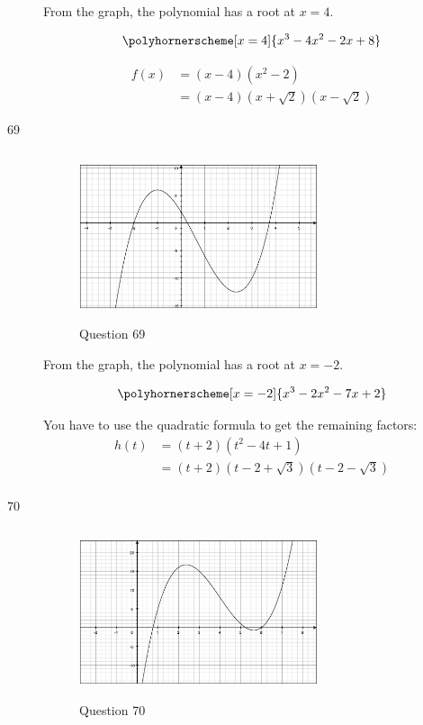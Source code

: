 \documentclass[fleqn,addpoints]{exam}
\begin{document}
\begin{description}
From the graph, the polynomial has a root at $x=4$.

\[
  \polyhornerscheme[x=4]{x^3-4x^2-2x+8} \\
\]

\begin{align*}
  f(x) &= (x-4)(x^2-2) \\
  &= (x-4)(x + \sqrt{2})(x - \sqrt{2})
\end{align*}

\item[69]
\begin{figure}[H]
  \centering
  \includegraphics[width=7cm,height=5cm]{question_69.eps}
  \caption*{Question 69}
\end{figure}

From the graph, the polynomial has a root at $x=-2$.

\[
  \polyhornerscheme[x=-2]{x^3-2x^2-7x+2} \\
\]

You have to use the quadratic formula to get the remaining factors:
\begin{align*}
  h(t) &= (t+2)(t^2 - 4t + 1) \\
   &= (t+2)(t - 2 + \sqrt{3})(t - 2 - \sqrt{3}) \\
\end{align*}

\item[70]

\begin{figure}[H]
  \centering
  \includegraphics[width=7cm,height=5cm]{question_70.eps}
  \caption*{Question 70}
\end{figure}


\end{description}
\end{document}
